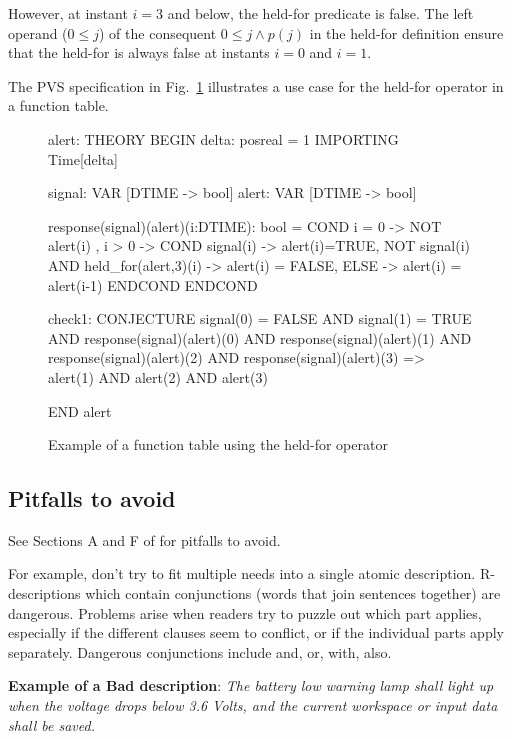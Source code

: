 However, at instant $i=3$ and below, the held-for predicate is false. 
The left operand ($0\leq j$) of the consequent 
$0 \leq j \land p(j)$ in the held-for definition ensure that the held-for is always false at instants $i=0$ and $i=1$.

The PVS specification in Fig.~\ref{fig:hft}  illustrates a use case for the held-for operator in a function table.

\begin{figure}
\begin{pvs}
alert: THEORY
BEGIN
  delta: posreal = 1 %
  IMPORTING Time[delta]
  
  signal: VAR [DTIME -> bool] %
  alert: VAR [DTIME -> bool]  %

  response(signal)(alert)(i:DTIME): bool =
    COND
        i = 0 -> NOT alert(i) 
      , i > 0 -> 
        COND
             signal(i) 
          -> alert(i)=TRUE,
             NOT signal(i) AND held_for(alert,3)(i) 
          -> alert(i) = FALSE,        
             ELSE 
          -> alert(i) = alert(i-1)
          ENDCOND
   ENDCOND

  check1: CONJECTURE
        signal(0) = FALSE
    AND signal(1) = TRUE
    AND response(signal)(alert)(0)
    AND response(signal)(alert)(1)
    AND response(signal)(alert)(2)
    AND response(signal)(alert)(3)
    =>
      alert(1) AND alert(2) AND alert(3)
      
END alert
\end{pvs}
\caption{Example of a function table using the held-for operator}
\label{fig:hft}
\end{figure}


\subsection{Pitfalls to avoid}

See Sections A and F of \cite{telelogic} for pitfalls to avoid.

For example, don't try to fit multiple needs into a single atomic description.
R-descriptions which contain conjunctions (words that join sentences together)
are dangerous. Problems arise when readers try to puzzle out which part applies,
especially if the different clauses seem to conflict, or if the individual parts apply
separately. Dangerous conjunctions include and, or, with, also.

\smallskip
\textbf{Example of a Bad description}:
\emph{The battery low warning lamp shall light up when the voltage drops below 3.6
Volts, and the current workspace or input data shall be saved.}

